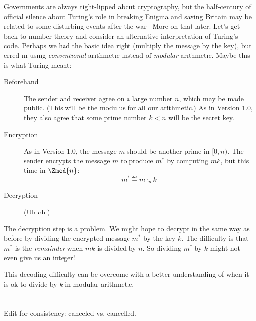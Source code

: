 Governments are always tight-lipped about cryptography, but the
half-century of official silence about Turing's role in breaking
Enigma and saving Britain may be related to some disturbing events
after the war --More on that later.  Let's get back to number theory
and consider an alternative interpretation of Turing's code.  Perhaps
we had the basic idea right (multiply the message by the key), but
erred in using \emph{conventional} arithmetic instead of
\emph{modular} arithmetic.  Maybe this is what Turing meant:
\begin{description}

\item[Beforehand] The sender and receiver agree on a large number $n$,
  which may be made public.  (This will be the modulus for all our
  arithmetic.)  As in Version 1.0, they also agree that some prime
  number $k < n$ will be the secret key.

\item[Encryption] As in Version 1.0, the message $m$ should be another
  prime in $[0, n)$.  The sender encrypts the message $m$ to produce
    $m^*$ by computing $mk$, but this time  in $\Zmod{n}$:
\begin{equation}
m^* \eqdef m \cdot_n k \label{eq:turing-code}
\end{equation}

\item[Decryption] (Uh-oh.)

\end{description}

The decryption step is a problem.  We might hope to decrypt in the
same way as before by dividing the encrypted message $m^*$ by the key
$k$.  The difficulty is that $m^*$ is the \emph{remainder} when $mk$
is divided by $n$.  So dividing $m^*$ by $k$ might not even give us an
integer!

This decoding difficulty can be overcome with a better understanding
of when it is ok to divide by $k$ in modular arithmetic.

\begin{problems}
\examproblems
{}
\end{problems}

\section{}\label{sec:inverse}

\begin{editingnotes}
Edit for consistency: canceled vs. cancelled.
\end{editingnotes}

